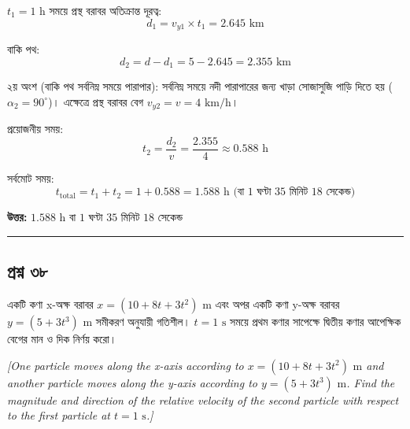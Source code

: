 \documentclass[11pt,a4paper]{article}
\begin{document}
$t_1 = 1\text{ h}$ সময়ে প্রস্থ বরাবর অতিক্রান্ত দূরত্ব:
$$d_1 = v_{y1} \times t_1 = 2.645\text{ km}$$

বাকি পথ:
$$d_2 = d - d_1 = 5 - 2.645 = 2.355\text{ km}$$

২য় অংশ (বাকি পথ সর্বনিম্ন সময়ে পারাপার):
সর্বনিম্ন সময়ে নদী পারাপারের জন্য খাড়া সোজাসুজি পাড়ি দিতে হয় ($\alpha_2 = 90^\circ$)। এক্ষেত্রে প্রস্থ বরাবর বেগ $v_{y2} = v = 4\text{ km/h}$।

প্রয়োজনীয় সময়:
$$t_2 = \frac{d_2}{v} = \frac{2.355}{4} \approx 0.588\text{ h}$$

সর্বমোট সময়:
$$t_{\text{total}} = t_1 + t_2 = 1 + 0.588 = 1.588\text{ h}\text{ (বা } 1\text{ ঘণ্টা } 35\text{ মিনিট } 18\text{ সেকেন্ড)}$$

\textbf{উত্তর:} $1.588\text{ h}$ বা $1\text{ ঘণ্টা } 35\text{ মিনিট } 18\text{ সেকেন্ড}$

\vspace{0.5cm}
\hrule
\vspace{0.5cm}

\subsection*{প্রশ্ন ৩৮}

একটি কণা x-অক্ষ বরাবর $x = (10 + 8t + 3t^2)\text{ m}$ এবং অপর একটি কণা y-অক্ষ বরাবর $y = (5 + 3t^3)\text{ m}$ সমীকরণ অনুযায়ী গতিশীল। $t = 1\text{ s}$ সময়ে প্রথম কণার সাপেক্ষে দ্বিতীয় কণার আপেক্ষিক বেগের মান ও দিক নির্ণয় করো।

\smallskip
\textit{[One particle moves along the x-axis according to $x = (10 + 8t + 3t^2)\text{ m}$ and another particle moves along the y-axis according to $y = (5 + 3t^3)\text{ m}$. Find the magnitude and direction of the relative velocity of the second particle with respect to the first particle at $t = 1\text{ s}$.]}

\vspace{0.3cm}
\begin{center}
\end{center}
\end{document}
